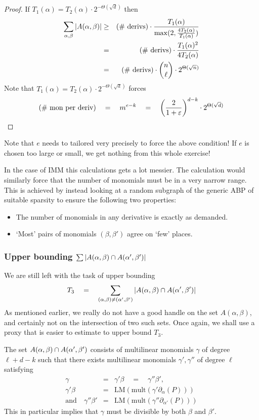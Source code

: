 \documentclass{beatcs}
\newcommand{\IMM}{\mathrm{IMM}}
\newcommand{\spaced}[1]{\quad#1\quad}
\renewcommand{\epsilon}{\varepsilon}
\begin{document}
\begin{proof}
If $T_1(\alpha) = T_2(\alpha) \cdot 2^{-\Theta(\sqrt{d})}$ then
\begin{eqnarray*}
\sum_{\alpha,\beta}\left|A(\alpha, \beta)\right| &\geq& \text{(\# derivs)}\cdot \frac{T_1(\alpha)}{\max(2, \frac{4T_2(\alpha)}{T_1(\alpha)})}\\
 & = & \text{(\# derivs)} \cdot \frac{T_1(\alpha)^2}{4 T_2(\alpha)}\\
 & = & \text{(\# derivs)} \cdot \binom{n}{\ell} \cdot 2^{\Theta(\sqrt{n})}
\end{eqnarray*}
Note that $T_1(\alpha) = T_2(\alpha) \cdot 2^{-\Theta(\sqrt{d})}$ forces 
\[
\text{(\# mon per deriv)} \spaced{=}  m^{e-k} \spaced{=}  \inparen{\frac{2}{1+\epsilon}}^{d-k} \cdot 2^{\Theta(\sqrt{d})}
\]
\end{proof}

Note that $e$ needs to tailored very precisely to force the above condition! If $e$ is chosen too large or small, we get nothing from this whole exercise!

In the case of $\IMM$ this calculations gets a lot messier. The calculation would similarly force that the number of monomials must be in a very narrow range. This is achieved by instead looking at a random subgraph of the generic ABP of suitable sparsity to ensure the following two properties:
\begin{itemize}
  \item The number of monomials in any derivative is exactly as demanded. 
  \item `Most' pairs of monomials $(\beta, \beta')$ agree on `few' places. 
\end{itemize}

\subsubsection*{Upper bounding $\sum \left|A(\alpha,\beta)\cap A(\alpha',\beta')\right|$}

We are still left with the task of upper bounding
\[
T_3 \quad = \quad \sum_{(\alpha, \beta)\neq (\alpha',\beta')} \left|A(\alpha, \beta) \cap A(\alpha',\beta')\right|
\]
As mentioned earlier, we really do not have a good handle on the set $A(\alpha, \beta)$, and certainly not on the intersection of two such sets. Once again, we shall use a proxy that is easier to estimate to upper bound $T_3$. 

The set $A(\alpha, \beta) \cap A(\alpha',\beta')$ consists of multilinear monomials $\gamma$ of degree $\ell + d -k$ such that there exists multilinear monomials $\gamma', \gamma''$ of degree $\ell$ satisfying
\begin{eqnarray*}
\gamma & = & \gamma' \beta \spaced{=} \gamma'' \beta',\\
 \gamma'\beta & = & \mathrm{LM}(\mathrm{mult}(\gamma' \partial_\alpha(P)))\\
\text{and}\quad \gamma''\beta' & = & \mathrm{LM}(\mathrm{mult}(\gamma'' \partial_{\alpha'}(P)))
\end{eqnarray*}
This in particular implies that $\gamma$ must be divisible by both $\beta$ and $\beta'$. 
\end{document}
